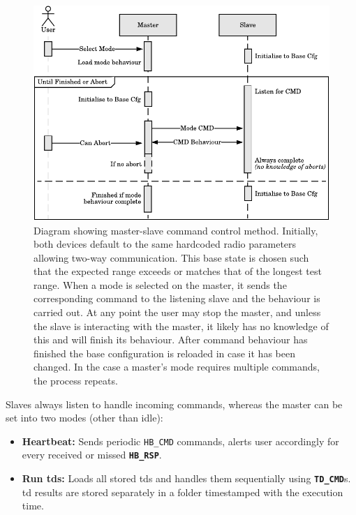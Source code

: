 \begin{figure}[H]
    \centering
    \includegraphics{Figures/software_cmd_system.pdf}
    \caption[Master-Slave command control method]{
    	Diagram showing master-slave command control method. Initially, both devices default to the same hardcoded radio parameters allowing two-way communication. This base state is chosen such that the expected range exceeds or matches that of the longest test range. When a mode is selected on the master, it sends the corresponding command to the listening slave and the behaviour is carried out. At any point the user may stop the master, and unless the slave is interacting with the master, it likely has no knowledge of this and will finish its behaviour. After command behaviour has finished the base configuration is reloaded in case it has been changed. In the case a master's mode requires multiple commands, the process repeats.
    }
    \label{fig:software_cmd_system}
\end{figure}
\vspace{-0mm}
Slaves always listen to handle incoming commands, whereas the master can be set into two modes (other than idle):
\begin{itemize}
	\item \textbf{Heartbeat:} Sends periodic \texttt{HB\_CMD} commands, alerts user accordingly for every received or missed \textbf{\texttt{HB\_RSP}}.
	\item {\textbf{Run \ac{td}s:} Loads all stored \ac{td}s and handles them sequentially using \textbf{\texttt{TD\_CMD}}s. \ac{td} results are stored separately in a folder timestamped with the execution time.}
\end{itemize}


